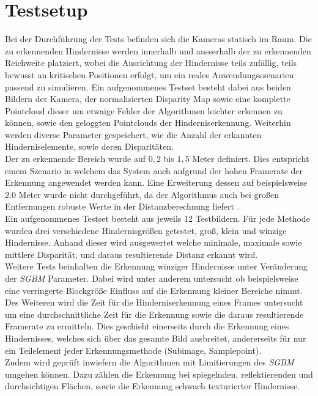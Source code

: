 


\section{Testsetup}
\label{sec:aufbau}

Bei der Durchführung der Tests befinden sich die Kameras statisch im Raum. Die zu erkennenden Hindernisse werden innerhalb und ausserhalb der zu erkennenden Reichweite platziert, wobei die Ausrichtung der Hindernisse teils zufällig, teils bewusst an kritischen Positionen erfolgt, um ein reales Anwendungsszenarien passend zu simulieren. Ein aufgenommenes Testset besteht dabei aus beiden Bildern der Kamera, der normalisierten Disparity Map sowie eine komplette Pointcloud dieser um etwaige Fehler der Algorithmen leichter erkennen zu können, sowie den geloggten Pointclouds der Hinderniserkennung. Weiterhin werden diverse Parameter gespeichert, wie die Anzahl der erkannten Hinderniselemente, sowie deren Disparitäten.\\
Der zu erkennende Bereich wurde auf $0,2$ bis $1,5$ Meter definiert. Dies entspricht einem Szenario in welchem das System auch aufgrund der hohen Framerate der Erkennung angewendet werden kann. Eine Erweiterung dessen auf beispielsweise $2.0$ Meter wurde nicht durchgeführt, da der Algorithmus auch bei großen Entfernungen robuste Werte in der Distanzberechnung liefert \cite{hilleralhallak}. \\

\noindent
Ein aufgenommenes Testset besteht aus jeweils 12 Testbildern. Für jede Methode wurden drei verschiedene Hindernisgrößen getestet, groß, klein und winzige Hindernisse. Anhand dieser wird ausgewertet welche minimale, maximale sowie mittlere Disparität, und daraus resultierende Distanz erkannt wird.\\

\noindent
Weitere Tests beinhalten die Erkennung winziger Hindernisse unter Veränderung der \emph{SGBM} Parameter. Dabei wird unter anderem untersucht ob beispielsweise eine verringerte Blockgröße Einfluss auf die Erkennung kleiner Bereiche nimmt. Des Weiteren wird die Zeit für die Hinderniserkennung eines Frames untersucht um eine durchschnittliche Zeit für die Erkennung sowie die daraus resultierende Framerate zu ermitteln. Dies geschieht einerseits durch die Erkennung eines Hindernisses, welches sich über das gesamte Bild ausbreitet, andererseits für nur ein Teilelement jeder Erkennungsmethode (Subimage, Samplepoint).\\
Zudem wird geprüft inwiefern die Algorithmen mit Limitierungen des \emph{SGBM} umgehen können. Dazu zählen die Erkennung bei spiegelnden, reflektierenden und durchsichtigen Flächen, sowie die Erkennung schwach texturierter Hindernisse.\\

